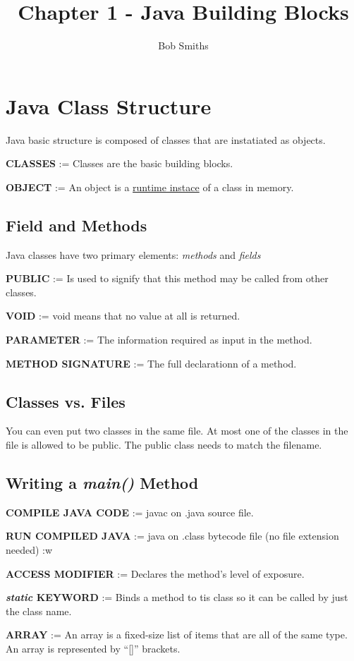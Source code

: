 \documentclass{article}
\author{Bob Smiths}
\title{Chapter 1 - Java Building Blocks}
\begin{document}
\maketitle

\section{Java Class Structure}
Java basic structure is composed of classes that are instatiated as objects.

\textbf{CLASSES} := Classes are the basic building blocks.

\textbf{OBJECT} := An object is a \underline{runtime instace} of a class in memory.

\subsection{Field and Methods}
Java classes have two primary elements: \textit{methods} and \textit{fields}

\textbf{PUBLIC} := Is used to signify that this method may be called from other classes.

\textbf{VOID} := void means that no value at all is returned.

\textbf{PARAMETER} := The information required as input in the method.

\textbf{METHOD SIGNATURE} := The full declarationn of a method.

\subsection{Classes vs. Files}
You can even put two classes in the same file. At most one of the classes in the file is allowed to be public.
The public class needs to match the filename.

\subsection{Writing a \textit{main()} Method}
\textbf{COMPILE JAVA CODE} := javac on .java source file.

\textbf{RUN COMPILED JAVA} := java on .class bytecode file (no file extension needed)
:w

\textbf{ACCESS MODIFIER} := Declares the method's level of exposure.

\textbf{\textit{static} KEYWORD} := Binds a method to tis class so it can be called by just the class name.

\textbf{ARRAY} := An array is a fixed-size list of items that are all of the same type. An array is represented by ``[]'' brackets.
\end{document}

